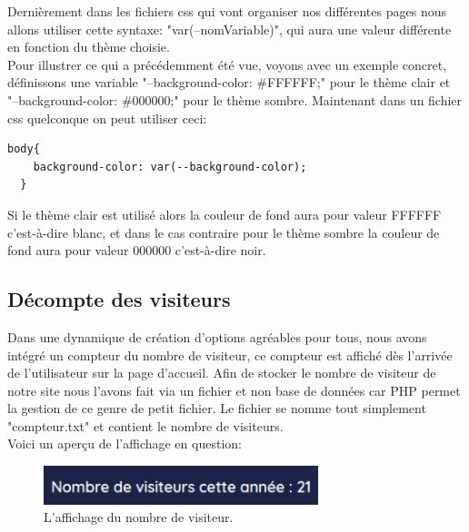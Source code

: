 \documentclass[a4paper,10pt]{article}
\begin{document}
Dernièrement dans les fichiers css qui vont organiser nos différentes pages nous allons utiliser cette syntaxe: "var(--nomVariable)", qui aura une valeur différente en fonction du thème choisie.\\

Pour illustrer ce qui a précédemment été vue, voyons avec un exemple concret, définissons une variable "--background-color: \#FFFFFF;" pour le thème clair et "--background-color: \#000000;" pour le thème sombre. Maintenant dans un fichier css quelconque on peut utiliser ceci:
\begin{lstlisting}[language=HTML]
  body{
    background-color: var(--background-color);
  }
\end{lstlisting}
Si le thème clair est utilisé alors la couleur de fond aura pour valeur FFFFFF c'est-à-dire blanc, et dans le cas contraire pour le thème sombre la couleur de fond aura pour valeur 000000 c'est-à-dire noir.

\subsection{Décompte des visiteurs}
Dans une dynamique de création d'options agréables pour tous, nous avons intégré un compteur du nombre de visiteur, ce compteur est affiché dès l'arrivée de l'utilisateur sur la page d'accueil. Afin de stocker le nombre de visiteur de notre site nous l'avons fait via un fichier et non base de données car PHP permet la gestion de ce genre de petit fichier. Le fichier se nomme tout simplement "compteur.txt" et contient le nombre de visiteurs.\\

Voici un aperçu de l'affichage en question: 
\begin{figure}[!h]
\centerline{\includegraphics[width=8cm]{images/numberVisiteurs.PNG}}
\caption{L'affichage du nombre de visiteur.}
\label{fig}
\end{figure}
\end{document}

